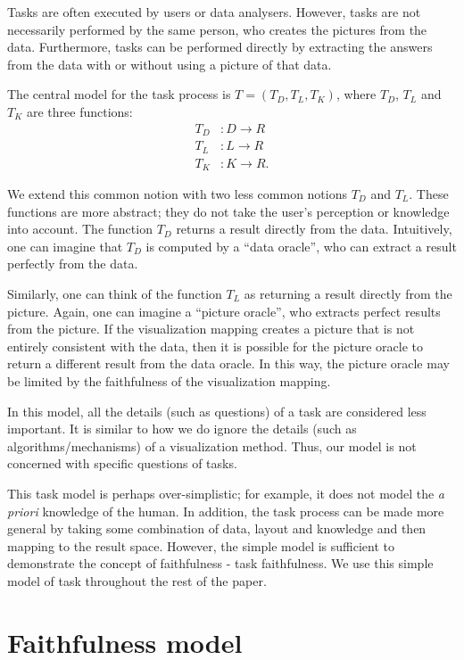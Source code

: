 \documentclass[10pt,journal,cspaper,compsoc]{IEEEtran}
\begin{document}
Tasks are often executed by users or data analysers. However, tasks are not necessarily performed by the same person, who creates the pictures from the data. 
Furthermore, tasks can be performed directly by extracting the answers from the data with or without using a picture of that data. 

The central model for the task process is $T = (T_D, T_L, T_K)$, where $T_D$, $T_L$ and $T_K$ are three functions:
\begin{align*}
\label{eq:task}
T_D &: D \rightarrow R\\
T_L &: L \rightarrow R\\
T_K &: K \rightarrow R.
\end{align*}

We extend this common notion with two less common notions $T_D$ and $T_L$. These functions are more abstract; they do not take the user’s perception or knowledge into account. The function $T_D$ returns a result directly from the data. Intuitively, one can imagine that $T_D$ is computed by a ``data oracle'', who can extract a result perfectly from the data.


Similarly, one can think of the function $T_L$ as returning a result directly from the picture. Again, one can imagine a ``picture oracle'', who extracts perfect results from the picture. If the visualization mapping creates a picture that is not entirely consistent with the data, then it is possible for the picture oracle to return a different result from the data oracle. In this way, the picture oracle may be limited by the faithfulness of the visualization mapping.



In this model, all the details (such as questions) of a task are considered less important. It is similar to how we do ignore the details (such as algorithms/mechanisms) of a visualization method. Thus, our model is not concerned with specific questions of tasks.



This task model is perhaps over-simplistic; for example, it does not model the \emph{a priori} knowledge of the human. In addition, the task process can be made more general by taking some combination of data, layout and knowledge and then mapping to the result space. However, the simple model is sufficient to demonstrate the concept of faithfulness - task faithfulness. We use this simple model of task throughout the rest of the paper.


\section{Faithfulness model\label{sec:vizfaithfulness}}
\end{document}
